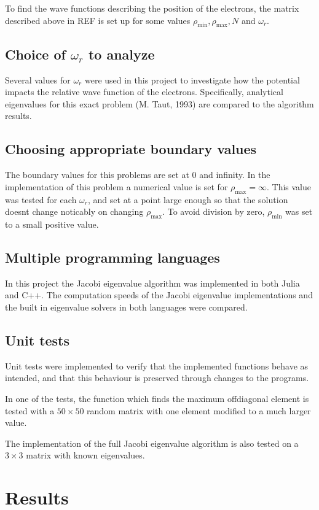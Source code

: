 \documentclass[aps,reprint]{revtex4-1}
\begin{document}
To find the wave functions describing the position of the electrons, the matrix
described above in REF is set up for some values \(\rho_{\text{min}},
\rho_{\text{max}}, N\) and \(\omega_{r}\).
\subsection{Choice of $\omega_r$ to analyze}
Several values for $\omega_r$ were used in this project to investigate how the
potential impacts the relative wave function of the electrons. Specifically,
analytical eigenvalues for this exact problem (M. Taut, 1993) are compared
to the algorithm results.
\subsection{Choosing appropriate boundary values}
The boundary values for this problems are set at $0$ and infinity. In the
implementation of this problem a numerical value is set for $\rho_\text{max} = \infty$.
This value was tested for each $\omega_r$, and set at a point large enough
so that the solution doesnt change noticably on changing $\rho_\text{max}$.
To avoid division by zero, $\rho_\text{min}$ was set to a small positive value.
\subsection{Multiple programming languages}
In this project the Jacobi eigenvalue algorithm was implemented in both Julia and
C++. The computation speeds of the Jacobi eigenvalue implementations
and the built in eigenvalue solvers in both languages were compared.
\subsection{Unit tests}
Unit tests were implemented to verify that the implemented functions behave
as intended, and that this behaviour is preserved through changes to the programs.

In one of the tests, the function which finds the maximum offdiagonal element
is tested with a $50 \times 50$ random matrix with one element modified to a
much larger value.

The implementation of the full Jacobi eigenvalue algorithm is also tested on a
$3 \times 3$ matrix with known eigenvalues.
\section{Results}
\label{sec:results}
\end{document}
